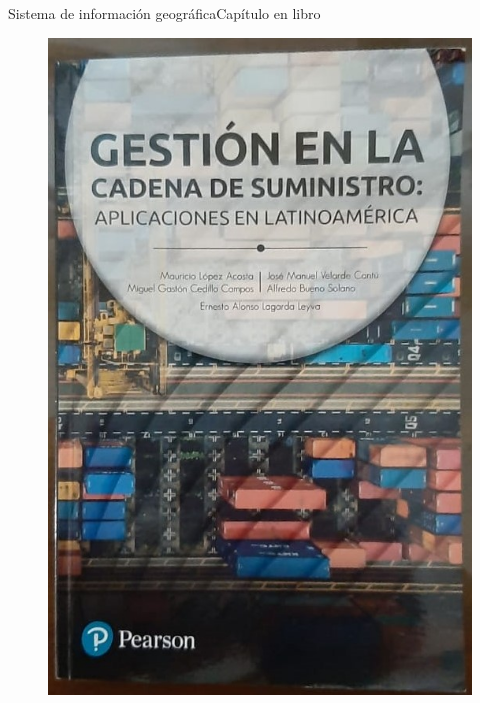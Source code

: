 \documentclass{beamer}
\begin{document}
    \begin{frame}{Sistema de información geográfica}{Capítulo en libro}
        \begin{figure}[]
            \centering
            \includegraphics[height=0.95\textheight]{libro}
        \end{figure}
    \end{frame}
\end{document}
